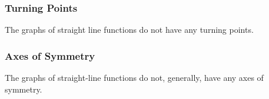         \label{m39338*uid87}
            \subsubsection{ Turning Points}
            \nopagebreak
          \label{m39338*id239341}The graphs of straight line functions do not have any turning points.\par 
        \label{m39338*uid88}
            \subsubsection{ Axes of Symmetry}
            \nopagebreak
          \label{m39338*id239358}The graphs of straight-line functions do not, generally, have any axes of symmetry.\par 
        \label{m39338*uid89}
